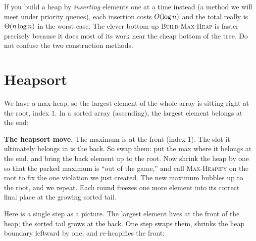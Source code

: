 \begin{trapbox}
If you build a heap by \emph{inserting} elements one at a time instead (a method
we will meet under priority queues), each insertion costs $O(\log n)$ and the
total really is $\Theta(n\log n)$ in the worst case. The clever bottom-up
\textsc{Build-Max-Heap} is faster precisely because it does most of its work near
the cheap bottom of the tree. Do not confuse the two construction methods.
\end{trapbox}

\section{Heapsort}

We have a max-heap, so the largest element of the whole array is
sitting right at the root, index $1$. In a
sorted array (ascending), the largest element belongs at the end:

\begin{intuitionbox}
\textbf{The heapsort move.} The maximum is at the front (index $1$). The slot it
ultimately belongs in is the back. So swap them: put the max where it belongs at
the end, and bring the back element up to the root. Now shrink the heap by one so
that the parked maximum is ``out of the game,'' and call \textsc{Max-Heapify} on
the root to fix the one violation we just created. The new maximum bubbles up to
the root, and we repeat. Each round freezes one more element into its correct
final place at the growing sorted tail.
\end{intuitionbox}

Here is a single step as a picture. The largest element lives at the front of the
heap; the sorted tail grows at the back. One step swaps them, shrinks the heap
boundary leftward by one, and re-heapifies the front:

